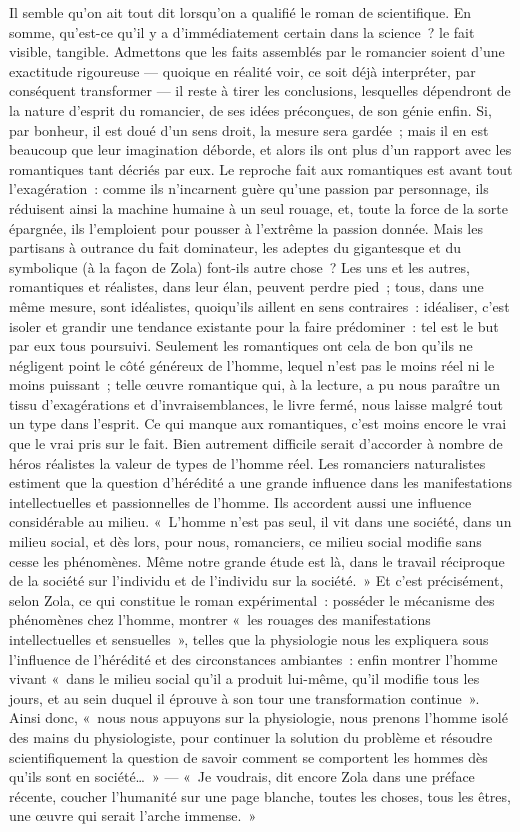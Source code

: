 \documentclass[french,twoside]{book} %
\begin{document}
Il semble qu’on ait tout dit lorsqu’on a qualifié le roman de scientifique. En somme, qu’est-ce qu’il y a d’immédiatement certain dans la science ? le fait visible, tangible. Admettons que les faits assemblés par le romancier soient d’une exactitude rigoureuse — quoique en réalité voir, ce soit déjà interpréter, par conséquent transformer — il reste à tirer les conclusions, lesquelles dépendront de la nature d’esprit du romancier, de ses idées préconçues, de son génie enfin. Si, par bonheur, il est doué d’un sens droit, la mesure sera gardée ; mais il en est beaucoup que leur imagination déborde, et alors ils ont plus d’un rapport avec les romantiques tant décriés par eux. Le reproche fait aux romantiques est avant tout l’exagération : comme ils n’incarnent guère qu’une passion par personnage, ils réduisent ainsi la machine humaine à un seul rouage, et, toute la force de la sorte épargnée, ils l’emploient pour pousser à l’extrême la passion donnée. Mais les partisans à outrance du fait dominateur, les adeptes du gigantesque et du symbolique (à la façon de Zola) font-ils autre chose ? Les uns et les autres, romantiques et réalistes, dans leur élan, peuvent perdre pied ; tous, dans une même mesure, sont idéalistes, quoiqu’ils aillent en sens contraires : idéaliser, c’est isoler et grandir une tendance existante pour la faire prédominer : tel est le but par eux tous poursuivi. Seulement les romantiques ont cela de bon qu’ils ne négligent point le côté généreux de l’homme, lequel n’est pas le moins réel ni le moins puissant ; telle œuvre romantique qui, à la lecture, a pu nous paraître un tissu d’exagérations et d’invraisemblances, le livre fermé, nous laisse malgré tout un type dans l’esprit. Ce qui manque aux romantiques, c’est moins encore le vrai que le vrai pris sur le fait. Bien autrement difficile serait d’accorder à nombre de héros réalistes la valeur de types de l’homme réel. Les romanciers naturalistes estiment que la question d’hérédité a une grande influence dans les manifestations intellectuelles et passionnelles de l’homme. Ils accordent aussi une influence considérable au milieu. « L’homme n’est pas seul, il vit dans une société, dans un milieu social, et dès lors, pour nous, romanciers, ce milieu social modifie sans cesse les phénomènes. Même notre grande étude est là, dans le travail réciproque de la société sur l’individu et de l’individu sur la société. » Et c’est précisément, selon Zola, ce qui constitue le roman expérimental : posséder le mécanisme des phénomènes chez l’homme, montrer « les rouages des manifestations intellectuelles et sensuelles », telles que la physiologie nous les expliquera sous l’influence de l’hérédité et des circonstances ambiantes : enfin montrer l’homme vivant « dans le milieu social qu’il a produit lui-même, qu’il modifie tous les jours, et au sein duquel il éprouve à son tour une transformation continue ». Ainsi donc, « nous nous appuyons sur la physiologie, nous prenons l’homme isolé des mains du physiologiste, pour continuer la solution du problème et résoudre scientifiquement la question de savoir comment se comportent les hommes dès qu’ils sont en société… » — « Je voudrais, dit encore Zola dans une préface récente, coucher l’humanité sur une page blanche, toutes les choses, tous les êtres, une œuvre qui serait l’arche immense. »\par
\end{document}
